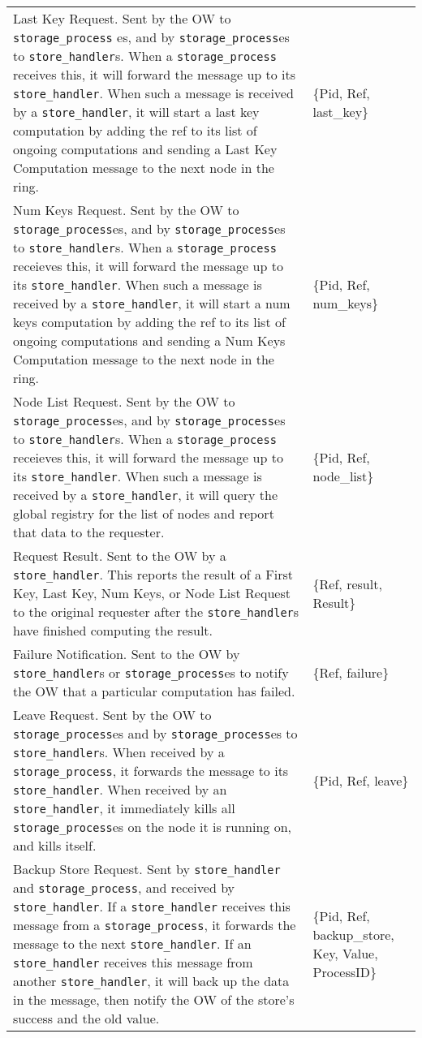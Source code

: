 \documentclass[12pt,letterpaper]{article}
\renewcommand{\tt}[1]{\texttt{#1}}
\newcommand{\sh}{\tt{store\_handler}}
\renewcommand{\sp}{\tt{storage\_process}}
\begin{document}
\begin{longtable}{p{4.5in}T}
Last Key Request. Sent by the OW to \sp{} es, and by \sp es to \sh s. When a \sp{} receives this, it will forward the message up to its \sh. When such a message is received by a \sh, it will start a last key computation by adding the ref to its list of ongoing computations and sending a Last Key Computation message to the next node in the ring. &
\{Pid, Ref, last\_key\} \\

Num Keys Request. Sent by the OW to \sp es, and by \sp es to \sh s. When a \sp{} receieves this, it will forward the message up to its \sh. When such a message is received by a \sh, it will start a num keys computation by adding the ref to its list of ongoing computations and sending a Num Keys Computation message to the next node in the ring. &
\{Pid, Ref, num\_keys\} \\

Node List Request. Sent by the OW to \sp es, and by \sp es to \sh s. When a \sp{} receieves this, it will forward the message up to its \sh.  When such a message is received by a \sh, it will query the global registry for the list of nodes and report that data to the requester. &
\{Pid, Ref, node\_list\} \\

Request Result. Sent to the OW by a \sh. This reports the result of a First Key, Last Key, Num Keys, or Node List Request to the original requester after the \sh s have finished computing the result. &
\{Ref, result, Result\} \\

Failure Notification. Sent to the OW by \sh s or \sp es to notify the OW that a particular computation has failed. &
\{Ref, failure\} \\

Leave Request. Sent by the OW to \sp es and by \sp es to \sh s. When received by a \sp, it forwards the message to its \sh. When received by an \sh, it immediately kills all \sp es on the node it is running on, and kills itself. &
\{Pid, Ref, leave\} \\

Backup Store Request. Sent by \sh{} and \sp, and received by \sh. If a \sh{} receives this message from a \sp, it forwards the message to the next \sh. If an \sh{} receives this message from another \sh, it will back up the data in the message, then notify the OW of the store's success and the old value. & 
\{Pid, Ref, backup\_store, Key, Value, ProcessID\} \\


\end{longtable}
\end{document}
